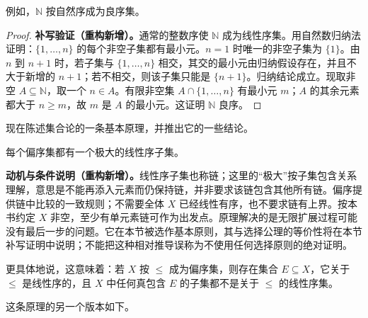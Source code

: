 \documentclass[../../main.tex]{subfiles}%
\begin{document}
\begin{example}\label{example:ch00-natural-well-order}
例如，$\mathbb{N}$ 按自然序成为良序集。
\end{example}
\begin{proof}
\textbf{补写验证（重构新增）。}通常的整数序使 $\mathbb{N}$ 成为线性序集。用自然数归纳法证明：$\{1,\ldots,n\}$ 的每个非空子集都有最小元。$n=1$ 时唯一的非空子集为 $\{1\}$。由 $n$ 到 $n+1$ 时，若子集与 $\{1,\ldots,n\}$ 相交，其交的最小元由归纳假设存在，并且不大于新增的 $n+1$；若不相交，则该子集只能是 $\{n+1\}$。归纳结论成立。现取非空 $A\subseteq\mathbb{N}$，取一个 $n\in A$。有限非空集 $A\cap\{1,\ldots,n\}$ 有最小元 $m$；$A$ 的其余元素都大于 $n\geqslant m$，故 $m$ 是 $A$ 的最小元。这证明 $\mathbb{N}$ 良序。
\end{proof}



现在陈述集合论的一条基本原理，并推出它的一些结论。

\begin{principle}\label{principle:ch00-hausdorff-maximal}
每个偏序集都有一个极大的线性序子集。
\end{principle}
\begin{remark}
\textbf{动机与条件说明（重构新增）。}线性序子集也称链；这里的“极大”按子集包含关系理解，意思是不能再添入元素而仍保持链，并非要求该链包含其他所有链。偏序提供链中比较的一致规则；不需要全体 $X$ 已经线性有序，也不要求链有上界。按本书约定 $X$ 非空，至少有单元素链可作为出发点。原理解决的是无限扩展过程可能没有最后一步的问题。它在本节被选作基本原则，其与选择公理的等价性将在本节补写证明中说明；不能把这种相对推导误称为不使用任何选择原则的绝对证明。
\end{remark}


\begin{remark}
更具体地说，这意味着：若 $X$ 按 $\leqslant$ 成为偏序集，则存在集合 $E\subseteq X$，它关于 $\leqslant$ 是线性序的，且 $X$ 中任何真包含 $E$ 的子集都不是关于 $\leqslant$ 的线性序集。
\end{remark}
这条原理的另一个版本如下。
\end{document}
